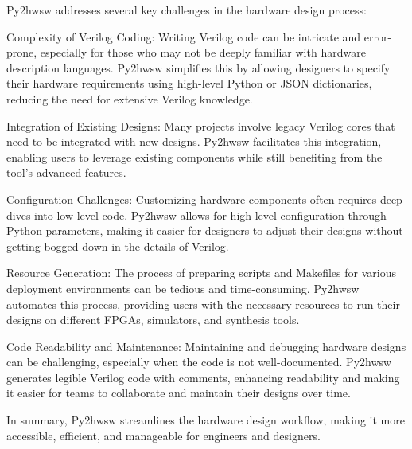 Py2hwsw addresses several key challenges in the hardware design process:

Complexity of Verilog Coding: Writing Verilog code can be intricate and error-prone, especially for those who may not be deeply familiar with hardware description languages. Py2hwsw simplifies this by allowing designers to specify their hardware requirements using high-level Python or JSON dictionaries, reducing the need for extensive Verilog knowledge.

Integration of Existing Designs: Many projects involve legacy Verilog cores that need to be integrated with new designs. Py2hwsw facilitates this integration, enabling users to leverage existing components while still benefiting from the tool's advanced features.

Configuration Challenges: Customizing hardware components often requires deep dives into low-level code. Py2hwsw allows for high-level configuration through Python parameters, making it easier for designers to adjust their designs without getting bogged down in the details of Verilog.

Resource Generation: The process of preparing scripts and Makefiles for various deployment environments can be tedious and time-consuming. Py2hwsw automates this process, providing users with the necessary resources to run their designs on different FPGAs, simulators, and synthesis tools.

Code Readability and Maintenance: Maintaining and debugging hardware designs can be challenging, especially when the code is not well-documented. Py2hwsw generates legible Verilog code with comments, enhancing readability and making it easier for teams to collaborate and maintain their designs over time.

In summary, Py2hwsw streamlines the hardware design workflow, making it more accessible, efficient, and manageable for engineers and designers.
